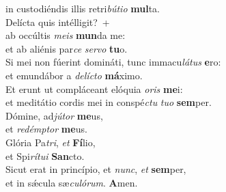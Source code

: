 \evenverse in custodiéndis illis retri\textit{bú}\textit{ti}\textit{o} \textbf{mul}ta.\\
\oddverse Delícta quis intélligit?~+\\
\oddverse  ab occúltis \textit{me}\textit{is} \textbf{mun}da me:~\*\\
\oddverse et ab aliénis par\textit{ce} \textit{ser}\textit{vo} \textbf{tu}o.\\
\evenverse Si mei non fúerint domináti, tunc immacu\textit{lá}\textit{tus} \textbf{e}ro:~\*\\
\evenverse et emundábor a \textit{de}\textit{lí}\textit{cto} \textbf{má}ximo.\\
\oddverse Et erunt ut compláceant elóquia \textit{o}\textit{ris} \textbf{me}i:~\*\\
\oddverse et meditátio cordis mei in conspé\textit{ctu} \textit{tu}\textit{o} \textbf{sem}per.\\
\evenverse Dómine, ad\textit{jú}\textit{tor} \textbf{me}us,~\*\\
\evenverse et \textit{re}\textit{dém}\textit{ptor} \textbf{me}us.\\
\oddverse Glória Pa\textit{tri}, \textit{et} \textbf{Fí}lio,~\*\\
\oddverse et Spi\textit{rí}\textit{tu}\textit{i} \textbf{San}cto.\\
\evenverse Sicut erat in princípio, et \textit{nunc}, \textit{et} \textbf{sem}per,~\*\\
\evenverse et in sǽcula sæ\textit{cu}\textit{ló}\textit{rum}. \textbf{A}men.\\
